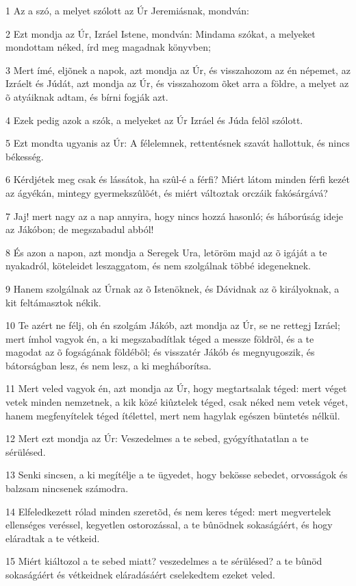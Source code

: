 \par 1 Az a szó, a melyet szólott az Úr Jeremiásnak, mondván:
\par 2 Ezt mondja az Úr, Izráel Istene, mondván: Mindama szókat, a melyeket mondottam néked, írd meg magadnak könyvben;
\par 3 Mert ímé, eljõnek a napok, azt mondja az Úr, és visszahozom az én népemet, az Izráelt és Júdát, azt mondja az Úr, és visszahozom õket arra a földre, a melyet az õ atyáiknak adtam, és bírni fogják azt.
\par 4 Ezek pedig azok a szók, a melyeket az Úr Izráel és Júda felõl szólott.
\par 5 Ezt mondta ugyanis az Úr: A félelemnek, rettentésnek szavát hallottuk, és nincs békesség.
\par 6 Kérdjétek meg csak és lássátok, ha szûl-é a férfi? Miért látom minden férfi kezét az ágyékán, mintegy gyermekszûlõét, és miért változtak orczáik fakósárgává?
\par 7 Jaj! mert nagy az a nap annyira, hogy nincs hozzá hasonló; és háborúság ideje az Jákóbon; de megszabadul abból!
\par 8 És azon a napon, azt mondja a Seregek Ura, letöröm majd az õ igáját a te nyakadról, köteleidet leszaggatom, és nem szolgálnak többé idegeneknek.
\par 9 Hanem szolgálnak az Úrnak az õ Istenöknek, és Dávidnak az õ királyoknak, a kit feltámasztok nékik.
\par 10 Te azért ne félj, oh én szolgám Jákób, azt mondja az Úr, se ne rettegj Izráel; mert ímhol vagyok én, a ki megszabadítlak téged a messze földrõl, és a te magodat az õ fogságának földébõl; és visszatér Jákób és megnyugoszik, és bátorságban lesz, és nem lesz, a ki megháborítsa.
\par 11 Mert veled vagyok én, azt mondja az Úr, hogy megtartsalak téged: mert véget vetek minden nemzetnek, a kik közé kiûztelek téged, csak néked nem vetek véget, hanem megfenyítelek téged ítélettel, mert nem hagylak egészen büntetés nélkül.
\par 12 Mert ezt mondja az Úr: Veszedelmes a te sebed, gyógyíthatatlan a te sérülésed.
\par 13 Senki sincsen, a ki megítélje a te ügyedet, hogy bekösse sebedet, orvosságok és balzsam nincsenek számodra.
\par 14 Elfeledkezett rólad minden szeretõd, és nem keres téged: mert megvertelek ellenséges veréssel, kegyetlen ostorozással, a te bûnödnek sokaságáért, és hogy eláradtak a te vétkeid.
\par 15 Miért kiáltozol a te sebed miatt? veszedelmes a te sérülésed? a te bûnöd sokaságáért és vétkeidnek eláradásáért cselekedtem ezeket veled.
